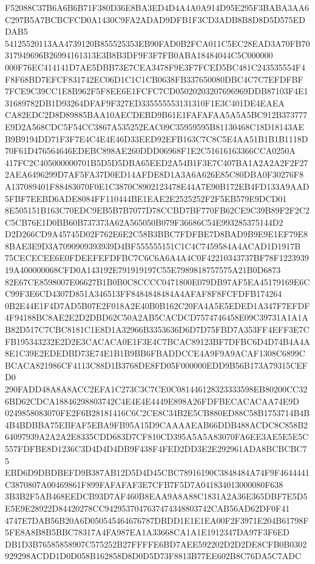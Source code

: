 \documentclass[UTF8,fontset=fandol,zihao=-4,a4paper]{ctexart}
\begin{document}
{{F52088C37B6A6B6B71F380D36E8BA3ED4D4A4A0A914D95E295F3BABA3AA6C297B5A7BCBCFCD0A1430C9FA2ADAD9DFB1F3CD3ADB8B8D8D5D575EDDAB5
54125520113AA4739120B855525353EB90FAD0B2FCA011C5EC28EAD3A70FB70317949696B26994161313E3B8B3DF9F3F7FB0ABA18484044C5C000000
000F76EC414141D7AE5DBB73E7CEA3478F9E3F7FCED5BC481C243535554F4F8F68BD7EFCF831742EC06D1C1C1CB0638FB337650080DBC4C7C7EFDFBF
7FCE9C39CC1E8B962F5F8EE6E1FCFC7CD05020203207696969DDB87103F4E131689782DB1D93264DFAF9F327ED335555553131310F1E3C401DE4EAEA
CA82EDC2D8D89885BAA10AECDEBD9B61E1FAFAFAA5A5A5BC912B373777E9D2A568CDC5F54CC3867A535252EAC09C35959595B81130468C18D18143AE
B9B9194DD71F3F7E4C4E4E46D33EED92EFB163C7C8C5E4AA51B1B1B1118D70F61D476564646EDEBC898AE260DDD06968F1E2C51616163366CCA0250A
417FC2C405000000701B5D5D5DBA65EED2A54B1F3E7C407BA1A2A2A2F2F272AEA6496299D7AF5FA37D0ED14AFDE8D1A3A6A626E85C80DBA0F30276F8
A137089401F88483070F0E1C3870C8902123478E44A7E90B172EB4FD133A9AAD5FBF7EEBD6ADE8084FF110444BE1EAE2E2525252F2F5EB579E9DCD01
8E505151B163C70EDC9EB5B7B7077D78CCBD7BF770FB62CE9C39B89F2F2C2C5CB76E1D0BB60B737373A62A565050B079F36686C54E993285375144D2
D2D266CD9A45745D02F762E6E2C58B3BBC7FDFBE7D8BAD9B9E9E1EF79E88BAE3E9D3A7090909393939D4BF555555151C1C4C7459584A4ACAD1D1917B
75CECECEE6E0FDEEFEFDFBC7C6C6A6A4A4C0F42210343737BF78F122393919A400000068CFD0A143192E791919197C55E7989818757575A21B0D6873
82E67CE8598007E06627B1B0B0C8CCCC0471800E079DB97AF5EA45179169E6CC99F3E6CD4307D851A346513FF8484848484A4AFAF8F8FCFDFB174264
0B2E44E1F4D7AD5B07E2F018A2E40B0B162C20FA4A5E5EDED1A347F7EFDF4F94188BC8AE2E2D2DBD62C50A2AB5CACDCD7574746458E09C39731A1A1A
B82D517C7CBC8181C1E8D1A32966B3353636D6D7D75FBD7A353FF4EFF3E7CFB195343232E2D2E3CACACA0E1F3E4C7BCAC89123BF7DFBC6D4D74B4A4A
8E1C39E2EDEDBD73E74E1B1B9BB6FBADDCCE4A9F9A9ACAF1308C6899CBCACA821986CF4113C88D1B3768DE8FD05F000000EDD9B56B173A79315CEFD0
290FADD48A8A8ACC2EFA1C273C3C7CE0C081446128323333598EB80200CC326BD62CDCA18846298803742C4E4E4E4449E898A26FDFBECACACAA74E9D
0249858083070FE2F6B28181416C6C2CE8C34B2E5CB880ED88C58B1753714B4B4B4BDBBA75EBFAF5EBA9FB95A15D9CAAAAEAB66DDB488ACDC8C858B2
64097939A2A2A2E8335CDD683D7CF810CD395A5A5A83070FA6EE3AE5E5E5C557FDFBE8D1236C3D4D4D4DB9F438F4FED2DD3E2E292961ADA8BCBCBC75
EBD6D9DBDBEFD9B387AB12D5D4D45CBC78916190C3848484A74F9F4644441C3870807A00469861F899FAFAFAF3E7CFB7F5D7A041834013000080F638
3B3B2F5AB468EEDCB93D7AF460B8EAA9A8A88C1831A2A36E365DBF7E5D5E5E9E28922D84420278CC9429537047637474348803742CAB56AD62DF0F41
4747E7DAB56B20A6D050545464676787DBDD1E1E1EA00F2F3971E204B61798F5FE8A8B8B5BBC78317A4FA987EA1A33668CA1A1E1912347DA97F3F6ED
DB1D3B76585858907C575252B27FFFFE6BD7AEE592202D2D2DE8CFB0B0302929298ACDD1D0D058B162858D8D0D5D73F8813B77EE602B8C76DA5C7ADC
}}
\end{document}
